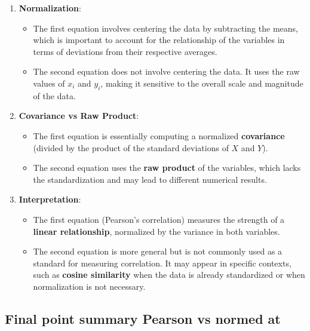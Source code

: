 \documentclass[
  12 pt,
  a4paper,
]{book}
\providecommand{\tightlist}{%
  \setlength{\itemsep}{0pt}\setlength{\parskip}{0pt}}
\numberwithin{equation}{section}
\theoremstyle{plain}      %
\theoremstyle{definition} %
\theoremstyle{remark}     %
\theoremstyle{note}         %
\begin{document}
\begin{enumerate}
\def\labelenumi{\arabic{enumi}.}
\tightlist
\item
  \textbf{Normalization}:

  \begin{itemize}
  \tightlist
  \item
    The first equation involves centering the data by subtracting the
    means, which is important to account for the relationship of the
    variables in terms of deviations from their respective averages.
  \item
    The second equation does not involve centering the data. It uses the
    raw values of \(x_i\) and \(y_i\), making it sensitive to the
    overall scale and magnitude of the data.
  \end{itemize}
\item
  \textbf{Covariance vs Raw Product}:

  \begin{itemize}
  \tightlist
  \item
    The first equation is essentially computing a normalized
    \textbf{covariance} (divided by the product of the standard
    deviations of \(X\) and \(Y\)).
  \item
    The second equation uses the \textbf{raw product} of the variables,
    which lacks the standardization and may lead to different numerical
    results.
  \end{itemize}
\item
  \textbf{Interpretation}:

  \begin{itemize}
  \tightlist
  \item
    The first equation (Pearson's correlation) measures the strength of
    a \textbf{linear relationship}, normalized by the variance in both
    variables.
  \item
    The second equation is more general but is not commonly used as a
    standard for measuring correlation. It may appear in specific
    contexts, such as \textbf{cosine similarity} when the data is
    already standardized or when normalization is not necessary.
  \end{itemize}
\end{enumerate}

\hypertarget{final-point-summary-pearson-vs-normed-at}{%
\subsection{Final point summary Pearson vs normed
at}\label{final-point-summary-pearson-vs-normed-at}}
\end{document}
